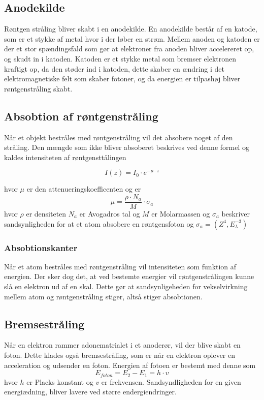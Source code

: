 \documentclass[a4paper,twoside]{article}
\begin{document}
\subsection{Anodekilde}
Røntgen stråling bliver skabt i en anodekilde. En anodekilde består af en katode, som er et stykke af metal hvor i der løber en strøm. Mellem anoden og katoden er der et stor spændingsfald som gør at elektroner fra anoden bliver accelereret op, og skudt in i katoden. Katoden er et stykke metal som bremser elektronen kraftigt op, da den støder ind i katoden, dette skaber en ændring i det elektromagnetiske felt som skaber fotoner, og da energien er tilpashøj bliver røntgenstråling skabt.
\subsection{Absobtion af røntgenstråling}
Når et objekt bestråles med røntgenstråling vil det absobere noget af den stråling. Den mængde som ikke bliver absoberet beskrives ved denne formel og kaldes intensiteten af røntgensttålingen  

\begin{equation}
    I(z)=I_0\cdot e^{-\mu\cdot z}
\end{equation}

hvor $\mu$ er den attenueringskoefficenten og er 
\begin{equation}
    \mu=\frac{\rho\cdot N_a}{M}\cdot\sigma _a 
\end{equation}
hvor $\rho$ er densiteten $N_a$ er Avogadros tal og $M$ er Molarmassen og $\sigma _a$ beskriver sandsynligheden for at et atom absobere en røntgensfoton og $\sigma _a =(Z^4,E_\lambda^{-3})$

\subsubsection{Absobtionskanter}
Når et atom bestråles med røntgenstråling vil intensiteten som funktion af energien. Der sker dog det, at ved bestemte energier vil røntgenstrålingen kunne slå en elektron ud af en skal. Dette gør at sandsynligeheden for vekselvirkning mellem atom og røntgenstråling stiger, altså stiger absobtionen. 

\subsection{Bremsestråling}
Når en elektron rammer adonematrialet i et anoderør, vil der blive skabt en foton. Dette klades også bremsestråling, som er når en elektron oplever en acceleration og udsender en foton. Energien af fotoen er bestemt med denne som
\begin{equation}
    E_{foton}=E_2-E_1=h\cdot v
    \end{equation}
hvor $h$ er Placks konstant og $v$ er frekvensen. Sandsyndligheden for en given energiædning, bliver lavere ved større endergiendringer.
\end{document}
